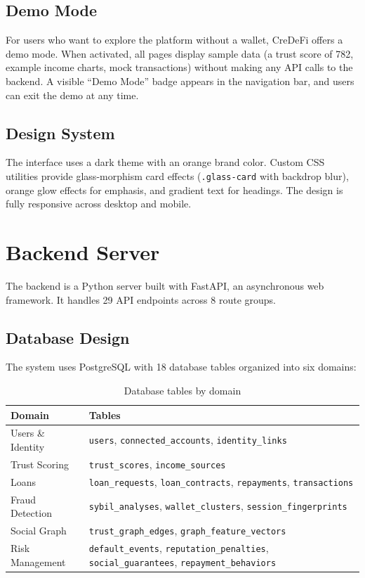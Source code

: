 \documentclass[12pt, a4paper]{article}
\begin{document}
\subsection{Demo Mode}

For users who want to explore the platform without a wallet, CreDeFi offers a demo mode. When activated, all pages display sample data (a trust score of 782, example income charts, mock transactions) without making any API calls to the backend. A visible ``Demo Mode'' badge appears in the navigation bar, and users can exit the demo at any time.

\subsection{Design System}

The interface uses a dark theme with an orange brand color. Custom CSS utilities provide glass-morphism card effects (\texttt{.glass-card} with backdrop blur), orange glow effects for emphasis, and gradient text for headings. The design is fully responsive across desktop and mobile.


\section{Backend Server}

The backend is a Python server built with FastAPI, an asynchronous web framework. It handles 29 API endpoints across 8 route groups.

\subsection{Database Design}

The system uses PostgreSQL with 18 database tables organized into six domains:

\begin{table}[H]
\centering
\caption{Database tables by domain}
\begin{tabularx}{\textwidth}{l X}
\toprule
\textbf{Domain} & \textbf{Tables} \\
\midrule
Users \& Identity & \texttt{users}, \texttt{connected\_accounts}, \texttt{identity\_links} \\
Trust Scoring & \texttt{trust\_scores}, \texttt{income\_sources} \\
Loans & \texttt{loan\_requests}, \texttt{loan\_contracts}, \texttt{repayments}, \texttt{transactions} \\
Fraud Detection & \texttt{sybil\_analyses}, \texttt{wallet\_clusters}, \texttt{session\_fingerprints} \\
Social Graph & \texttt{trust\_graph\_edges}, \texttt{graph\_feature\_vectors} \\
Risk Management & \texttt{default\_events}, \texttt{reputation\_penalties}, \texttt{social\_guarantees}, \texttt{repayment\_behaviors} \\
\bottomrule
\end{tabularx}
\end{table}
\end{document}
